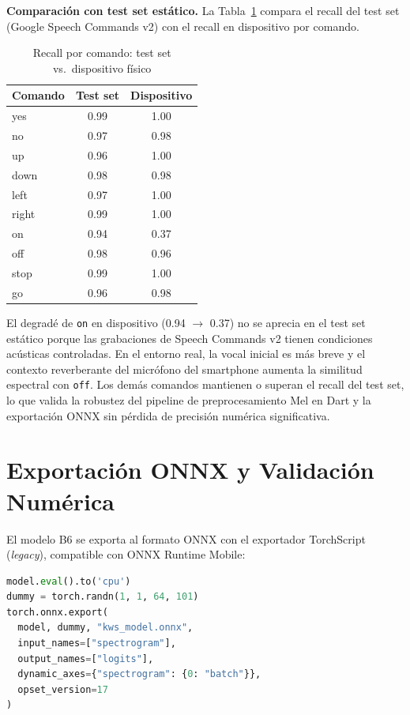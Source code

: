 \documentclass[conference]{IEEEtran}
\begin{document}
\textbf{Comparación con test set estático.}
La Tabla~\ref{tab:static_vs_mobile} compara el recall del test set
(Google Speech Commands v2) con el recall en dispositivo por comando.

\begin{table}[!h]
\caption{Recall por comando: test set vs.\ dispositivo físico}
\label{tab:static_vs_mobile}
\centering
\begin{tabular}{lcc}
\toprule
Comando & Test set & Dispositivo \\
\midrule
yes   & 0.99 & 1.00 \\
no    & 0.97 & 0.98 \\
up    & 0.96 & 1.00 \\
down  & 0.98 & 0.98 \\
left  & 0.97 & 1.00 \\
right & 0.99 & 1.00 \\
on    & 0.94 & 0.37 \\
off   & 0.98 & 0.96 \\
stop  & 0.99 & 1.00 \\
go    & 0.96 & 0.98 \\
\bottomrule
\end{tabular}
\end{table}

El degradé de \texttt{on} en dispositivo (0.94 $\to$ 0.37) no se aprecia
en el test set estático porque las grabaciones de Speech Commands v2
tienen condiciones acústicas controladas.  En el entorno real, la vocal
inicial es más breve y el contexto reverberante del micrófono del
smartphone aumenta la similitud espectral con \texttt{off}.
Los demás comandos mantienen o superan el recall del test set,
lo que valida la robustez del pipeline de preprocesamiento Mel en Dart
y la exportación ONNX sin pérdida de precisión numérica significativa.

\section{Exportación ONNX y Validación Numérica}

El modelo B6 se exporta al formato ONNX con el exportador TorchScript
(\textit{legacy}), compatible con ONNX Runtime Mobile:

\begin{lstlisting}[language=Python]
model.eval().to('cpu')
dummy = torch.randn(1, 1, 64, 101)
torch.onnx.export(
  model, dummy, "kws_model.onnx",
  input_names=["spectrogram"],
  output_names=["logits"],
  dynamic_axes={"spectrogram": {0: "batch"}},
  opset_version=17
)
\end{lstlisting}
\end{document}
